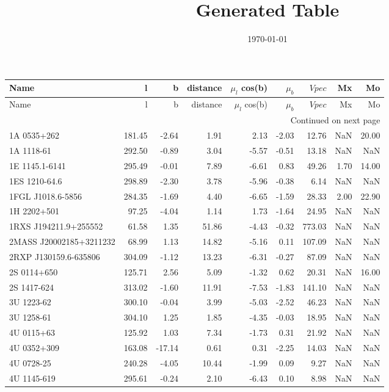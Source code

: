\documentclass{article}%
\title{Generated Table}%
\author{}%
\date{\today}%
\begin{document}
%
\normalsize%
\maketitle%
\begin{longtable}{lrrrrrrrr}
\toprule
Name & l & b & distance & $\mu_l$ cos(b) & $\mu_b$ & $V pec$ & Mx & Mo \\
\midrule
\endfirsthead
\toprule
Name & l & b & distance & $\mu_l$ cos(b) & $\mu_b$ & $V pec$ & Mx & Mo \\
\midrule
\endhead
\midrule
\multicolumn{9}{r}{Continued on next page} \\
\midrule
\endfoot
\bottomrule
\endlastfoot
1A 0535+262 & 181.45 & -2.64 & 1.91 & 2.13 & -2.03 & 12.76 & NaN & 20.00 \\
1A 1118-61 & 292.50 & -0.89 & 3.04 & -5.57 & -0.51 & 13.18 & NaN & NaN \\
1E 1145.1-6141 & 295.49 & -0.01 & 7.89 & -6.61 & 0.83 & 49.26 & 1.70 & 14.00 \\
1ES 1210-64.6 & 298.89 & -2.30 & 3.78 & -5.96 & -0.38 & 6.14 & NaN & NaN \\
1FGL J1018.6-5856 & 284.35 & -1.69 & 4.40 & -6.65 & -1.59 & 28.33 & 2.00 & 22.90 \\
1H 2202+501 & 97.25 & -4.04 & 1.14 & 1.73 & -1.64 & 24.95 & NaN & NaN \\
1RXS J194211.9+255552 & 61.58 & 1.35 & 51.86 & -4.43 & -0.32 & 773.03 & NaN & NaN \\
2MASS J20002185+3211232 & 68.99 & 1.13 & 14.82 & -5.16 & 0.11 & 107.09 & NaN & NaN \\
2RXP J130159.6-635806 & 304.09 & -1.12 & 13.23 & -6.31 & -0.27 & 87.09 & NaN & NaN \\
2S 0114+650 & 125.71 & 2.56 & 5.09 & -1.32 & 0.62 & 20.31 & NaN & 16.00 \\
2S 1417-624 & 313.02 & -1.60 & 11.91 & -7.53 & -1.83 & 141.10 & NaN & NaN \\
3U 1223-62 & 300.10 & -0.04 & 3.99 & -5.03 & -2.52 & 46.23 & NaN & NaN \\
3U 1258-61 & 304.10 & 1.25 & 1.85 & -4.35 & -0.03 & 18.95 & NaN & NaN \\
4U 0115+63 & 125.92 & 1.03 & 7.34 & -1.73 & 0.31 & 21.92 & NaN & NaN \\
4U 0352+309 & 163.08 & -17.14 & 0.61 & 0.31 & -2.25 & 14.03 & NaN & NaN \\
4U 0728-25 & 240.28 & -4.05 & 10.44 & -1.99 & 0.09 & 9.27 & NaN & NaN \\
4U 1145-619 & 295.61 & -0.24 & 2.10 & -6.43 & 0.10 & 8.98 & NaN & NaN \\

\end{longtable}
\end{document}
